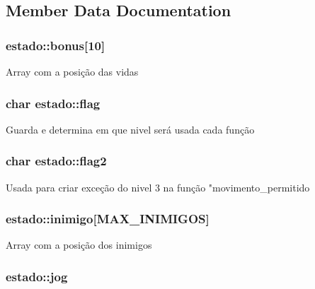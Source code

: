 \subsection{Member Data Documentation}
\hypertarget{structestado_a32ca181e16a34d1aef6c9df4864370be}{
\subsubsection[{bonus}]{ estado\+::bonus\mbox{[}10\mbox{]}}}\label{structestado_a32ca181e16a34d1aef6c9df4864370be}
Array com a posição das vidas \hypertarget{structestado_a4097f5ea4c96bc29ee48b6e3dd1c743b}{
\subsubsection[{flag}]{\setlength{\rightskip}{0pt plus 5cm}char estado\+::flag}}\label{structestado_a4097f5ea4c96bc29ee48b6e3dd1c743b}
Guarda e determina em que nivel será usada cada função \hypertarget{structestado_a76a9cfcab40ee794f38ca97867b433a5}{
\subsubsection[{flag2}]{\setlength{\rightskip}{0pt plus 5cm}char estado\+::flag2}}\label{structestado_a76a9cfcab40ee794f38ca97867b433a5}
Usada para criar exceção do nivel 3 na função "movimento\+\_\+permitido \hypertarget{structestado_a8f7d47deb337ae082beab6a574ace9e3}{
\subsubsection[{inimigo}]{ estado\+::inimigo\mbox{[}{\bf M\+A\+X\+\_\+\+I\+N\+I\+M\+I\+G\+O\+S}\mbox{]}}}\label{structestado_a8f7d47deb337ae082beab6a574ace9e3}
Array com a posição dos inimigos \hypertarget{structestado_abf55d0d40aafdd6829efbc8265b4f724}{
\subsubsection[{jog}]{ estado\+::jog}}\label{structestado_abf55d0d40aafdd6829efbc8265b4f724}
